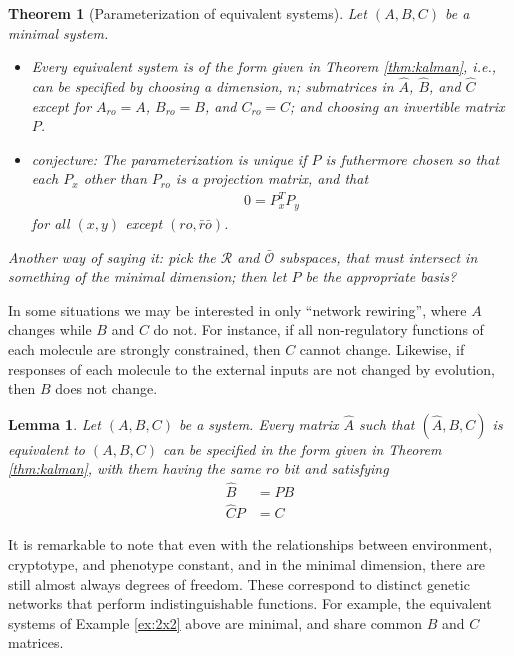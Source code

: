 \documentclass[11 pt]{article}
\newcommand{\plr}[1]{{\color{blue}\it #1}}
\newcommand{\ro}{{ro}}
\newcommand{\nrno}{{\bar{r}\bar{o}}}
\newcommand{\reachable}{\mathcal{R}}
\newcommand{\unobservable}{\bar{\mathcal{O}}}
\newtheorem{theorem}{Theorem}
\newtheorem{lemma}{Lemma}
\begin{document}
\begin{theorem}[Parameterization of equivalent systems]
    Let $(A,B,C)$ be a minimal system.
    \begin{itemize}
        \item[(a)]
            Every equivalent system is of the form given in Theorem \ref{thm:kalman},
            i.e., can be specified by choosing a dimension, $n$;
            submatrices in $\widehat A$, $\widehat B$, and $\widehat C$ 
            except for $A_\ro=A$, $B_\ro=B$, and $C_\ro=C$;
            and choosing an invertible matrix $P$.

        \item[(b)]
            \plr{conjecture:}
            The parameterization is unique
            if $P$ is futhermore chosen so that 
            each $P_x$ other than $P_\ro$ is a projection matrix,
            and that 
            \begin{align*}
                0
                =
                P_x^T P_y
            \end{align*}
            for all $(x,y)$ except $(\ro,\nrno)$.

    \end{itemize} 
\end{theorem}

\plr{Another way of saying it: pick the $\reachable$ and $\unobservable$ subspaces,
that must intersect in something of the minimal dimension;
then let $P$ be the appropriate basis?}

In some situations we may be interested in only ``network rewiring'',
where $A$ changes while $B$ and $C$ do not.
For instance, 
if all non-regulatory functions of each molecule are strongly constrained,
then $C$ cannot change.
Likewise, if responses of each molecule to the external inputs are not changed by evolution,
then $B$ does not change.

\begin{lemma}
    Let $(A,B,C)$ be a system.
    Every matrix $\widehat A$ such that $(\widehat A,B,C)$ is equivalent to $(A,B,C)$
    can be specified in the form given in Theorem \ref{thm:kalman},
    with \plr{them having the same $\ro$ bit}
    and satisfying
    \begin{align*}
        \widehat B &= P B \\
        \widehat C P &= C
    \end{align*}
\end{lemma}

It is remarkable to note that even with the relationships 
between environment, cryptotype, and phenotype constant,
and in the minimal dimension,
there are still almost always degrees of freedom.
These correspond to distinct genetic networks
that perform indistinguishable functions.
For example, the equivalent systems of Example \ref{ex:2x2} above
are minimal, and share common $B$ and $C$ matrices.
\end{document}
